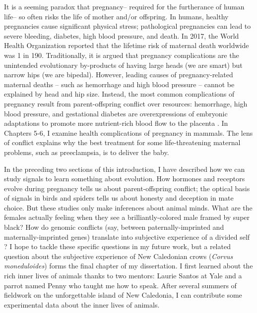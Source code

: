 \vspace{5mm}
\noindent{\textcolor{SchoolColor}{1.3 Pathologies of Pregnancy}}

It is a seeming paradox that pregnancy-- required for the furtherance of human life-- so often risks the life of mother and/or offspring. In humans, healthy pregnancies cause significant physical stress; pathological pregnancies can lead to severe bleeding, diabetes, high blood pressure, and death. In 2017, the World Health Organization reported that the lifetime risk of maternal death worldwide was 1 in 190. Traditionally, it is argued that pregnancy complications are the unintended evolutionary by-products of having large heads (we are smart) but narrow hips (we are bipedal). However, leading causes of pregnancy-related maternal deaths – such as hemorrhage and high blood pressure \cite{Say2014} -- cannot be explained by head and hip size. Instead, the most common complications of pregnancy result from parent-offspring conflict over resources: hemorrhage, high blood pressure, and gestational diabetes are overexpressions of embryonic adaptations to promote more nutrient-rich blood flow to the placenta \cite{Haig1993}. In Chapters 5-6, I examine health complications of pregnancy in mammals. The lens of conflict explains why the best treatment for some life-threatening maternal problems, such as preeclampsia, is to deliver the baby. 

\large{\newthought{\textcolor{SchoolColor}{3. Animal Minds}}}

\normalsize 
In the preceding two sections of this introduction, I have described how we can study signals to learn something about evolution. How hormones and receptors evolve during pregnancy tells us about parent-offspring conflict; the optical basis of signals in birds and spiders tells us about honesty and deception in mate choice. But these studies only make inferences about animal minds. What are the females actually feeling when they see a brilliantly-colored male framed by super black? How do genomic conflicts (say, between paternally-imprinted and maternally-imprinted genes) translate into subjective experience of a divided self \cite{Haig2020}? I hope to tackle these specific questions in my future work, but a related question about the subjective experience of New Caledonian crows (\emph{Corvus moneduloides}) forms the final chapter of my dissertation. I first learned about the rich inner lives of animals thanks to two mentors: Laurie Santos at Yale and a parrot named Penny who taught me how to speak. After several summers of fieldwork on the unforgettable island of New Caledonia, I can contribute some experimental data about the inner lives of animals.


